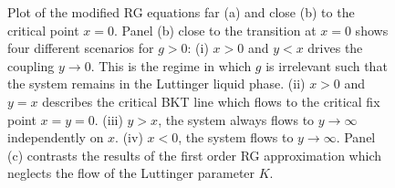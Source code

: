 \begin{figure}
    \caption{Plot of the modified RG equations far (a) and close (b) to the critical point $x=0$. Panel (b) close to the transition at $x=0$ shows four different scenarios for $g>0$: (i) $x>0$ and $y<x$ drives the coupling $y\rightarrow0$. This is the regime in which $g$ is irrelevant such that the system remains in the Luttinger liquid phase. (ii) $x>0$ and $y=x$ describes the critical BKT line which flows to the critical fix point $x=y=0$. (iii) $y>x$, the system always flows to $y\rightarrow\infty$ independently on $x$. (iv) $x<0$, the system flows to $y\rightarrow\infty$. Panel (c) contrasts the results of the first order RG approximation which neglects the flow of the Luttinger parameter $K$.}
    \label{fig:bkt_flow_equations}
\end{figure}
